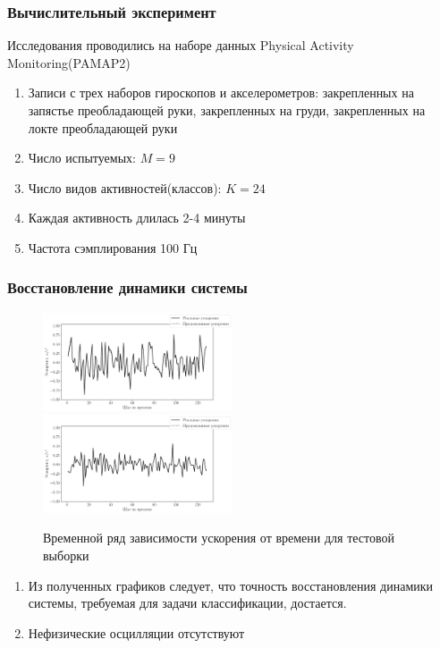 \documentclass{beamer}
\begin{document}
\begin{frame}
\frametitle{Вычислительный эксперимент}
Исследования проводились на наборе данных Physical Activity Monitoring(PAMAP2)
\begin{enumerate}
    \item Записи с трех наборов гироскопов и акселерометров: закрепленных на запястье преобладающей руки, закрепленных на груди, закрепленных на локте преобладающей руки
    \item Число испытуемых: $M = 9$
    \item Число видов активностей(классов): $K = 24$
    \item Каждая активность длилась 2-4 минуты
    \item Частота сэмплирования 100 Гц
\end{enumerate}

\end{frame}

\begin{frame}
\frametitle{Восстановление динамики системы}
\begin{figure}[H]
     \centering
     \includegraphics[width = 0.5\textwidth]{experiment4_1000.pickle_results_a.pdf}%
     \includegraphics[width = 0.5\textwidth]{experiment4_1000.pickle_results_b.pdf}
     \caption{Временной ряд зависимости ускорения от времени для тестовой выборки}
     \label{fig: trajectory}
\end{figure}
\begin{enumerate}
    \item Из полученных графиков следует, что точность восстановления динамики системы, требуемая для задачи классификации, достается.
    \item Нефизические осцилляции отсутствуют
\end{enumerate}
\end{frame}
\end{document}
